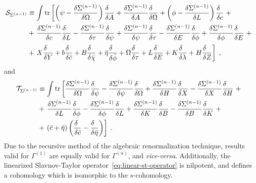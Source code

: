 \documentclass[../main.tex]{subfiles}
\begin{document}
\begin{align}
  \label{eq:linear-st-operator}
  \mathcal{S}_{\Sigma^{ (n-1) }} & \equiv \int \tr \left[\left(\psi-\frac{\delta\Sigma^{ (n-1) }}{\delta\Omega}\right)\frac{\delta\phantom{A}}{\delta A}+\frac{\delta\Sigma^{ (n-1) }}{\delta A}\frac{\delta\phantom{\Omega}}{\delta \Omega}+\left(\phi-\frac{\delta\Sigma^{ (n-1) }}{\delta L}\right)\frac{\delta\phantom{c}}{\delta c} \right. + \nonumber                                                                                                              \\
                                 & + \left. \frac{\delta\Sigma^{ (n-1) }}{\delta c}\frac{\delta\phantom{L}}{\delta L}-\frac{\delta\Sigma^{ (n-1) }}{\delta\tau}\frac{\delta\phantom{\psi}}{\delta\psi}+\frac{\delta\Sigma^{ (n-1) }}{\delta \psi}\frac{\delta\phantom{\tau}}{\delta \tau}-\frac{\delta\Sigma^{ (n-1) }}{\delta E}\frac{\delta\phantom{\phi}}{\delta\phi}+\frac{\delta\Sigma^{ (n-1) }}{\delta \phi}\frac{\delta\phantom{E}}{\delta E} \right. + \nonumber \\
                                 & + \left. X\frac{\delta\phantom{Y}}{\delta Y}+b\frac{\delta\phantom{\bar{c}}}{\delta\bar{c}}+B\frac{\delta\phantom{\bar{\chi}}}{\delta\bar{\chi}}+\bar{\eta}\frac{\delta\phantom{\bar{\phi}}}{\delta\bar{\phi}}+\Omega\frac{\delta\phantom{\tau}}{\delta\tau}+L\frac{\delta\phantom{E}}{\delta E}+K\frac{\delta\phantom{\lambda}}{\delta\lambda}+H\frac{\delta\phantom{Z}}{\delta Z}\right]\;,
\end{align}
and
\begin{align}
  \label{eq:linear-t-operator}
  \mathcal{T}_{\Sigma^{ (n-1) }} & \equiv \int \tr \left[\frac{\delta\Sigma^{ (n-1) }}{\delta \Omega}\frac{\delta\phantom{\psi}}{\delta \psi}-\frac{\delta\Sigma^{ (n-1) }}{\delta\psi}\frac{\delta\phantom{\Omega}}{\delta \Omega} + \frac{\delta\Sigma^{ (n-1) }}{\delta H}\frac{\delta\phantom{X}}{\delta X}-\frac{\delta\Sigma^{ (n-1) }}{\delta X}\frac{\delta\phantom{H}}{\delta H} \right. + \nonumber \\
                                 & +\left.\frac{\delta\Sigma^{ (n-1) }}{\delta L}\frac{\delta\phantom{\phi}}{\delta \phi}-\frac{\delta\Sigma^{ (n-1) }}{\delta \phi}\frac{\delta\phantom{L}}{\delta L}+\frac{\delta\Sigma^{ (n-1) }}{\delta K}\frac{\delta\phantom{B}}{\delta B}-\frac{\delta\Sigma^{ (n-1) }}{\delta B}\frac{\delta\phantom{K}}{\delta K} \right. + \nonumber                                \\
                                 & +\left.\left(\bar{c}+\bar{\eta}\right)\left(\frac{\delta\phantom{\bar{c}}}{\delta\bar{c}}-\frac{\delta\phantom{\bar{\eta}}}{\delta\bar{\eta}}\right)\right] \;.
\end{align}
Due to the recursive method of the algebraic renormalization technique, results valid for $ \Gamma^{ (1) } $ are equally valid for $ \Gamma^{ (n) } $, and \textit{vice-versa}. Additionally, the linearized Slavnov-Taylor operator~\eqref{eq:linear-st-operator} is nilpotent, and defines a cohomology which is isomorphic to the $ s $-cohomology.
\end{document}
